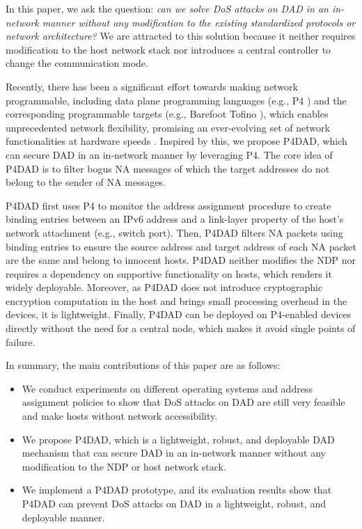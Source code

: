 \documentclass[journal]{IEEEtran}
\begin{document}
    In this paper, we ask the question: \emph{can we solve DoS attacks on DAD in an in-network manner without any modification to the existing standardized protocols or network architecture?} We are attracted to this solution because it neither requires modification to the host network stack nor introduces a central controller to change the communication mode.
    
    Recently, there has been a significant effort towards making network programmable, including data plane programming languages (e.g., P4 \cite{P4}) and the corresponding programmable targets (e.g., Barefoot Tofino \cite{tofino}), which enables unprecedented network flexibility, promising an ever-evolving set of network functionalities at hardware speeds \cite{yu2020netlock,zhang2020gallium,kim2020tea}.
    Inspired by this, we propose P4DAD, which can secure DAD in an in-network manner by leveraging P4.
    The core idea of P4DAD is to filter bogus NA messages of which the target addresses do not belong to the sender of NA messages. 
    
    P4DAD first uses P4 to monitor the address assignment procedure to create binding entries between an IPv6 address and a link-layer property of the host's network attachment (e.g., switch port). Then, P4DAD filters NA packets using binding entries to ensure the source address and target address of each NA packet are the same and belong to innocent hosts. P4DAD neither modifies the NDP nor requires a dependency on supportive functionality on hosts, which renders it widely deployable. 
    Moreover, as P4DAD does not introduce cryptographic encryption computation in the host and brings small processing overhead in the devices, it is lightweight. 
    Finally, P4DAD can be deployed on P4-enabled devices directly without the need for a central node, which makes it avoid single points of failure.

    In summary, the main contributions of this paper are as follows: 
    \begin{itemize}
        \item We conduct experiments on different operating systems and address assignment policies to show that DoS attacks on DAD are still very feasible and make hosts without network accessibility.

        \item We propose P4DAD, which is a lightweight, robust, and deployable DAD mechanism that can secure DAD in an in-network manner without any modification to the NDP or host network stack.


        \item We implement a P4DAD prototype, and its evaluation results show that P4DAD can prevent DoS attacks on DAD in a lightweight, robust, and deployable manner.
    \end{itemize}
   
\end{document}
